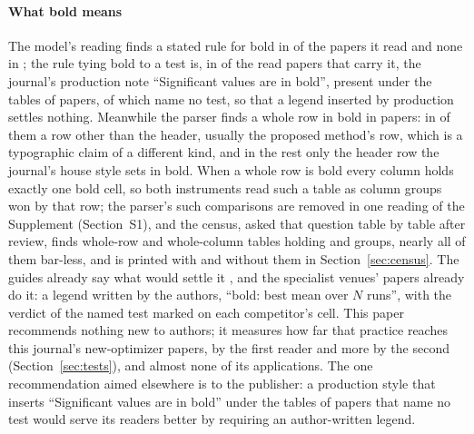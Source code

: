 \documentclass[preprint,review,12pt]{elsarticle}
\begin{document}
\paragraph{What bold means} The model's reading finds a stated rule for bold in \nTrAllBoldBestPct{} of the papers it read and none in \nTrAllBoldNotStatedPct{}; the rule tying bold to a test is, in \nTrNoteFiledStatisticallyBest{} of the \nTrNotePapersRead{} read papers that carry it, the journal's production note ``Significant values are in bold'', present under the tables of \nBnAllWithNote{} papers, \nBnAllNoteNoTestNamed{} of which name no test, so that a legend inserted by production settles nothing. Meanwhile the parser finds a whole row in bold in \nRbRowBoldPapers{} papers: in \nRbNonHeaderRowBoldPapers{} of them a row other than the header, usually the proposed method's row, which is a typographic claim of a different kind, and in the rest only the header row the journal's house style sets in bold. When a whole row is bold every column holds exactly one bold cell, so both instruments read such a table as column groups won by that row; the parser's \nRbRowBoldOnlyN{} such comparisons are removed in one reading of the Supplement (Section~S1), and the census, asked that question table by table after review, finds \nCrcWholeRowTables{} whole-row and \nCrcWholeColTables{} whole-column tables holding \nCrcWrGroups{} and \nCrcWcGroups{} groups, nearly all of them bar-less, and is printed with and without them in Section~\ref{sec:census}. The guides already say what would settle it \cite{derrac2011practical,latorre2021prescription}, and the specialist venues' papers already do it: a legend written by the authors, ``bold: best mean over $N$ runs'', with the verdict of the named test marked on each competitor's cell. This paper recommends nothing new to authors; it measures how far that practice reaches this journal's new-optimizer papers, \nTrNewOptimizerPctMarkers{} by the first reader and more by the second (Section~\ref{sec:tests}), and almost none of its applications. The one recommendation aimed elsewhere is to the publisher: a production style that inserts ``Significant values are in bold'' under the tables of \nBnAllNoteNoTestNamed{} papers that name no test would serve its readers better by requiring an author-written legend.
\end{document}
